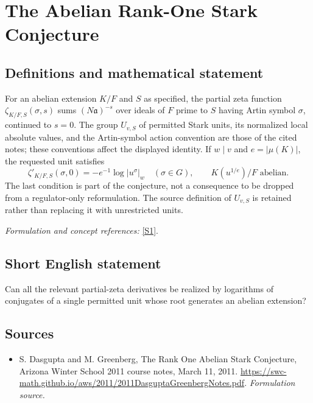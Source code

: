 \documentclass[11pt]{article}
\begin{document}
\section*{\texorpdfstring{The Abelian Rank-One Stark Conjecture}{The Abelian Rank-One Stark Conjecture}}\label{statement}
\subsection{Definitions and mathematical statement}
For an abelian extension $K/F$ and $S$ as specified, the partial zeta function $\zeta_{K/F,S}(\sigma,s)$ sums $(N\mathfrak a)^{-s}$ over ideals of $F$ prime to $S$ having Artin symbol $\sigma$, continued to $s=0$. The group $U_{v,S}$ of permitted Stark units, its normalized local absolute values, and the Artin-symbol action convention are those of the cited notes; these conventions affect the displayed identity. If $w\mid v$ and $e=|\mu(K)|$, the requested unit satisfies
\[
 \zeta'_{K/F,S}(\sigma,0)=-e^{-1}\log|u^\sigma|_w
 \quad(\sigma\in G),\qquad K(u^{1/e})/F\text{ abelian}.
\]
The last condition is part of the conjecture, not a consequence to be dropped from a regulator-only reformulation. The source definition of $U_{v,S}$ is retained rather than replacing it with unrestricted units.
\par\smallskip\textit{Formulation and concept references:} \href{https://swc-math.github.io/aws/2011/2011DasguptaGreenbergNotes.pdf}{[S1]}.

\subsection{Short English statement}
Can all the relevant partial-zeta derivatives be realized by logarithms of conjugates of a single permitted unit whose root generates an abelian extension?
\subsection{Sources}
\begin{itemize}
\item[S1]S. Dasgupta and M. Greenberg, The Rank One Abelian Stark Conjecture, Arizona Winter School 2011 course notes, March 11, 2011.
\url{https://swc-math.github.io/aws/2011/2011DasguptaGreenbergNotes.pdf}.
\textit{Formulation source.}
\end{itemize}
\end{document}
